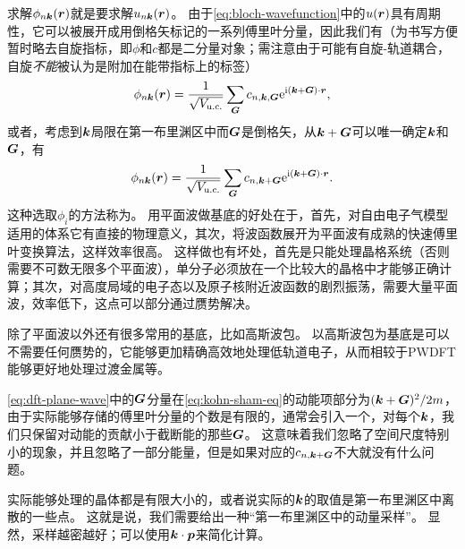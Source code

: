求解$\phi_{n \vb*{k}}(\vb*{r})$就是要求解$u_{n \vb*{k}}(\vb*{r})$。
由于\eqref{eq:bloch-wavefunction}中的$u(\vb*{r})$具有周期性，它可以被展开成用倒格矢标记的一系列傅里叶分量，因此我们有（为书写方便暂时略去自旋指标，即$\phi$和$c$都是二分量对象；需注意由于可能有自旋-轨道耦合，自旋\emph{不能}被认为是附加在能带指标上的标签）
\begin{equation}
    \phi_{n \vb*{k}}(\vb*{r}) = \frac{1}{\sqrt{V_\text{u.c.}}} \sum_{\vb*{G}} c_{n, \vb*{k}, \vb*{G}} \mathrm{e}^{\mathrm{i} (\vb*{k} + \vb*{G}) \cdot \vb*{r}},
\end{equation}
或者，考虑到$\vb*{k}$局限在第一布里渊区中而$\vb*{G}$是倒格矢，从$\vb*{k} + \vb*{G}$可以唯一确定$\vb*{k}$和$\vb*{G}$，有
\begin{equation}
    \phi_{n \vb*{k}}(\vb*{r}) = \frac{1}{\sqrt{V_\text{u.c.}}} \sum_{\vb*{G}} c_{n, \vb*{k} + \vb*{G}} \mathrm{e}^{\mathrm{i} (\vb*{k} + \vb*{G}) \cdot \vb*{r}}.
    \label{eq:dft-plane-wave}
\end{equation}
这种选取$\phi_i$的方法称为。
用平面波做基底的好处在于，首先，对自由电子气模型适用的体系它有直接的物理意义，其次，将波函数展开为平面波有成熟的快速傅里叶变换算法，这样效率很高。
这样做也有坏处，首先是只能处理晶格系统（否则需要不可数无限多个平面波），单分子必须放在一个比较大的晶格中才能够正确计算；其次，对高度局域的电子态以及原子核附近波函数的剧烈振荡，需要大量平面波，效率低下，这点可以部分通过赝势解决。

除了平面波以外还有很多常用的基底，比如高斯波包。
以高斯波包为基底是可以不需要任何赝势的，它能够更加精确高效地处理低轨道电子，从而相较于PWDFT能够更好地处理过渡金属等。

\eqref{eq:dft-plane-wave}中的$\vb*{G}$分量在\eqref{eq:kohn-sham-eq}的动能项部分为$(\vb*{k} + \vb*{G})^2 / 2m$，由于实际能够存储的傅里叶分量的个数是有限的，通常会引入一个，对每个$\vb*{k}$，我们只保留对动能的贡献小于截断能的那些$\vb*{G}$。
这意味着我们忽略了空间尺度特别小的现象，并且忽略了一部分能量，但是如果对应的$c_{n, \vb*{k} + \vb*{G}}$不大就没有什么问题。

实际能够处理的晶体都是有限大小的，或者说实际的$\vb*{k}$的取值是第一布里渊区中离散的一些点。
这就是说，我们需要给出一种“第一布里渊区中的动量采样”。
显然，采样越密越好；可以使用$\vb*{k} \cdot \vb*{p}$来简化计算。

